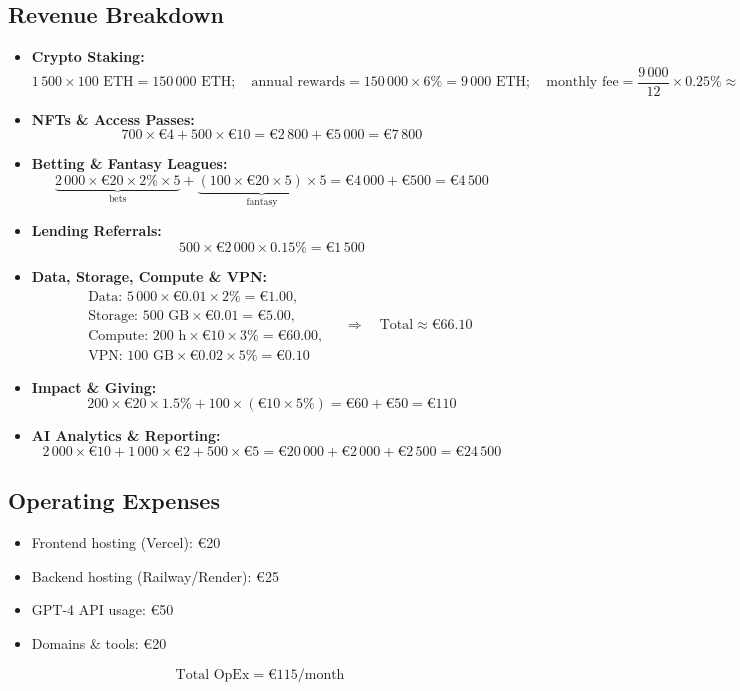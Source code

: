 \documentclass[13pt]{extarticle}
\begin{document}
\subsection{Revenue Breakdown}
\begin{itemize}[left=1em]
  \item \textbf{Crypto Staking:}
    \[
      1\,500\times100\text{ ETH}=150\,000\text{ ETH};\quad
      \text{annual rewards}=150\,000\times6\%=9\,000\text{ ETH};\quad
      \text{monthly fee}= \frac{9\,000}{12}\times0.25\%\approx1.875\text{ ETH}\approx€3\,750
    \]
  \item \textbf{NFTs \& Access Passes:}
    \[
      700\times€4 + 500\times€10 = €2\,800 + €5\,000 = €7\,800
    \]
  \item \textbf{Betting \& Fantasy Leagues:}
    \[
      \underbrace{2\,000\times€20\times2\%\times5}_{\text{bets}} + 
      \underbrace{(100\times€20\times5)\times5}_{\text{fantasy}} 
      = €4\,000 + €500 = €4\,500
    \]
  \item \textbf{Lending Referrals:}
    \[
      500\times€2\,000\times0.15\% = €1\,500
    \]
  \item \textbf{Data, Storage, Compute \& VPN:}
    \[
      \begin{aligned}
      &\text{Data: }5\,000\times€0.01\times2\%=€1.00,\\
      &\text{Storage: }500\text{ GB}\times€0.01=€5.00,\\
      &\text{Compute: }200\text{ h}\times€10\times3\%=€60.00,\\
      &\text{VPN: }100\text{ GB}\times€0.02\times5\%=€0.10
      \end{aligned}
      \quad\Rightarrow\quad \text{Total} \approx €66.10
    \]
  \item \textbf{Impact \& Giving:}
    \[
      200\times€20\times1.5\% + 100\times(€10\times5\%) = €60 + €50 = €110
    \]
  \item \textbf{AI Analytics \& Reporting:}
    \[
      2\,000\times€10 + 1\,000\times€2 + 500\times€5 = €20\,000 + €2\,000 + €2\,500 = €24\,500
    \]
\end{itemize}

\subsection{Operating Expenses}
\begin{itemize}[left=1em]
  \item Frontend hosting (Vercel): €20  
  \item Backend hosting (Railway/Render): €25  
  \item GPT-4 API usage: €50  
  \item Domains \& tools: €20  
\end{itemize}
\[
  \text{Total OpEx} = €115/\text{month}
\]
\end{document}
